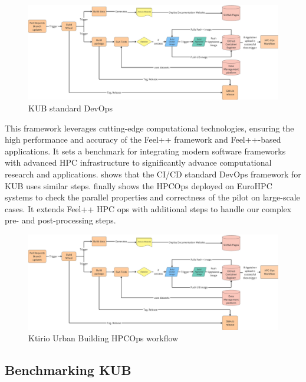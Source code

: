\documentclass[runningheads]{llncs}
\begin{document}
\begin{figure}
    \centering
    \includegraphics[width=\linewidth,page=1]{img-ub-devops-hpcops.pdf}
    \caption{KUB standard DevOps}
    \label{fig:kub-devops}
\end{figure}
This framework leverages cutting-edge computational technologies, ensuring the high performance and accuracy of the Feel++ framework and Feel++-based applications.
It sets a benchmark for integrating modern software frameworks with advanced HPC infrastructure to significantly advance computational research and applications.
 shows that the CI/CD standard DevOps framework for KUB uses similar steps.
 finally shows the HPCOps deployed on EuroHPC systems to check the parallel properties and correctness of the pilot on large-scale cases. It extends Feel++ HPC ops with additional steps to handle our complex pre- and post-processing steps.

\begin{figure}
    \centering
    \includegraphics[width=\linewidth,page=2]{img-ub-devops-hpcops.pdf}
    \caption{Ktirio Urban Building HPCOps workflow}
    \label{fig:kub-hpcops}
\end{figure}

\subsection{Benchmarking KUB}
\label{sec:benchmarking}
\end{document}
